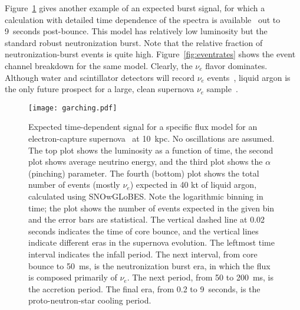 %


Figure~\ref{fig:garching} gives another example of an expected burst
signal, for which a calculation with detailed time dependence of the
spectra is available~\cite{Huedepohl:2009wh} out to 9~seconds
post-bounce.  This model has relatively low luminosity but the standard robust
neutronization burst.  Note that the relative fraction of
neutronization-burst events is quite high.
Figure~\ref{fig:eventrates} shows the event channel breakdown for the same model.  Clearly, the $\nu_e$
flavor dominates.  Although water and scintillator detectors will record $\nu_e$ events~\cite{Laha:2013hva,Laha:2014yua}, liquid argon is the only future prospect for a large, clean supernova $\nu_e$ sample~\cite{Scholberg:2012id}.


%
\begin{figure}[!htb]
\centering
\texttt{[image: garching.pdf]}
\caption[Garching flux signal with neutronization burst]{ Expected
  time-dependent signal for a specific flux model for an
  electron-capture supernova~\cite{Huedepohl:2009wh} at 10~kpc.  No oscillations are assumed. The
  top plot shows the luminosity as a function of time, the second plot
  shows average neutrino energy, and the third plot shows the $\alpha$
  (pinching) parameter.  The fourth (bottom) plot shows the total number of
  events (mostly $\nu_e$) expected in 40 kt of liquid argon, calculated using
  SNOwGLoBES.  Note the logarithmic binning in time; the plot shows
  the number of events expected in the given bin and the error bars
  are statistical. The vertical dashed line at 0.02 seconds indicates
  the time of core bounce, and the vertical lines indicate different
  eras in the supernova evolution.  The leftmost time interval
  indicates the infall period.  The next interval, from core bounce to
  50~ms, is the neutronization burst era, in which the flux is
  composed primarily of $\nu_e$.  The next period, from 50 to 200~ms,
  is the accretion period. The final era, from 0.2 to 9~seconds, is
  the proto-neutron-star cooling period.}
\label{fig:garching}
\end{figure}


